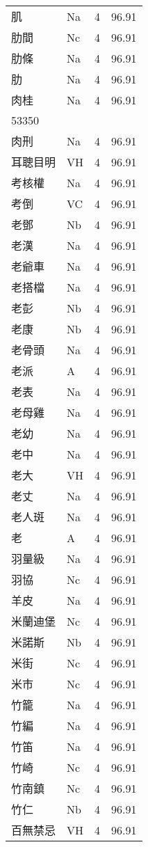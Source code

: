 \documentclass[twocolumn]{book}
\begin{document}
\begin{supertabular}{llrr}
肌 & Na & 4 &  96.91\\
肋間 & Nc & 4 &  96.91\\
肋條 & Na & 4 &  96.91\\
肋 & Na & 4 &  96.91\\
肉桂 & Na & 4 &  96.91\\
53350\\
肉刑 & Na & 4 &  96.91\\
耳聰目明 & VH & 4 &  96.91\\
考核權 & Na & 4 &  96.91\\
考倒 & VC & 4 &  96.91\\
老鄧 & Nb & 4 &  96.91\\
老漢 & Na & 4 &  96.91\\
老爺車 & Na & 4 &  96.91\\
老搭檔 & Na & 4 &  96.91\\
老彭 & Nb & 4 &  96.91\\
老康 & Nb & 4 &  96.91\\
老骨頭 & Na & 4 &  96.91\\
老派 & A & 4 &  96.91\\
老表 & Na & 4 &  96.91\\
老母雞 & Na & 4 &  96.91\\
老幼 & Na & 4 &  96.91\\
老中 & Na & 4 &  96.91\\
老大 & VH & 4 &  96.91\\
老丈 & Na & 4 &  96.91\\
老人斑 & Na & 4 &  96.91\\
老 & A & 4 &  96.91\\
羽量級 & Na & 4 &  96.91\\
羽協 & Nc & 4 &  96.91\\
羊皮 & Na & 4 &  96.91\\
米蘭迪堡 & Nc & 4 &  96.91\\
米諾斯 & Nb & 4 &  96.91\\
米街 & Nc & 4 &  96.91\\
米市 & Nc & 4 &  96.91\\
竹籠 & Na & 4 &  96.91\\
竹編 & Na & 4 &  96.91\\
竹笛 & Na & 4 &  96.91\\
竹崎 & Nc & 4 &  96.91\\
竹南鎮 & Nc & 4 &  96.91\\
竹仁 & Nb & 4 &  96.91\\
百無禁忌 & VH & 4 &  96.91\\

\end{supertabular}
\end{document}
